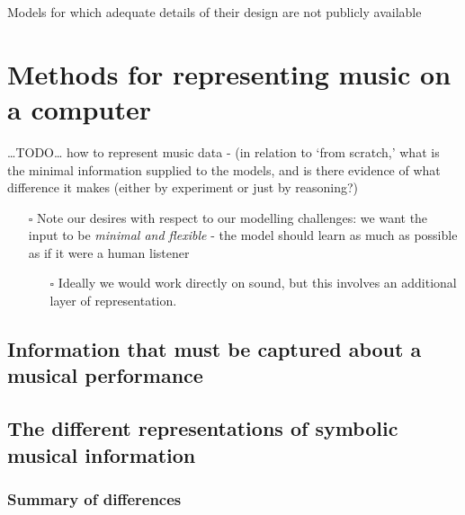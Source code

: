 \documentclass[12pt,a4paper,]{report}
\providecommand{\tightlist}{%
  \setlength{\itemsep}{0pt}\setlength{\parskip}{0pt}}
\begin{document}
Models for which adequate details of their design are not publicly
available

\hypertarget{methods-for-representing-music-on-a-computer}{%
\section{Methods for representing music on a
computer}\label{methods-for-representing-music-on-a-computer}}

\ldots TODO\ldots{} how to represent music data - (in relation to `from
scratch,' what is the minimal information supplied to the models, and is
there evidence of what difference it makes (either by experiment or just
by reasoning?)

\begin{itemize}
\tightlist
\item[$\square$]
  Note our desires with respect to our modelling challenges: we want the
  input to be \emph{minimal and flexible} - the model should learn as
  much as possible as if it were a human listener

  \begin{itemize}
  \tightlist
  \item[$\square$]
    Ideally we would work directly on sound, but this involves an
    additional layer of representation.
  \end{itemize}
\end{itemize}

\hypertarget{information-that-must-be-captured-about-a-musical-performance}{%
\subsection{Information that must be captured about a musical
performance}\label{information-that-must-be-captured-about-a-musical-performance}}

\hypertarget{the-different-representations-of-symbolic-musical-information}{%
\subsection{The different representations of symbolic musical
information}\label{the-different-representations-of-symbolic-musical-information}}

\hypertarget{summary-of-differences}{%
\subsubsection{Summary of differences}\label{summary-of-differences}}
\end{document}
